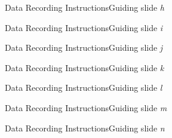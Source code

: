 \begin{frame}{Data Recording Instructions}{Guiding slide \textit{h}}
    \begin{center}
    \end{center}
\end{frame}

\begin{frame}{Data Recording Instructions}{Guiding slide \textit{i}}
    \begin{center}
    \end{center}
\end{frame}

\begin{frame}{Data Recording Instructions}{Guiding slide \textit{j}}
    \begin{center}
    \end{center}
\end{frame}

\begin{frame}{Data Recording Instructions}{Guiding slide \textit{k}}
    \begin{center}
    \end{center}
\end{frame}

\begin{frame}{Data Recording Instructions}{Guiding slide \textit{l}}
    \begin{center}
    \end{center}
\end{frame}

\begin{frame}{Data Recording Instructions}{Guiding slide \textit{m}}
    \begin{center}
    \end{center}
\end{frame}

\begin{frame}{Data Recording Instructions}{Guiding slide \textit{n}}
    \begin{center}
    \end{center}
\end{frame}


